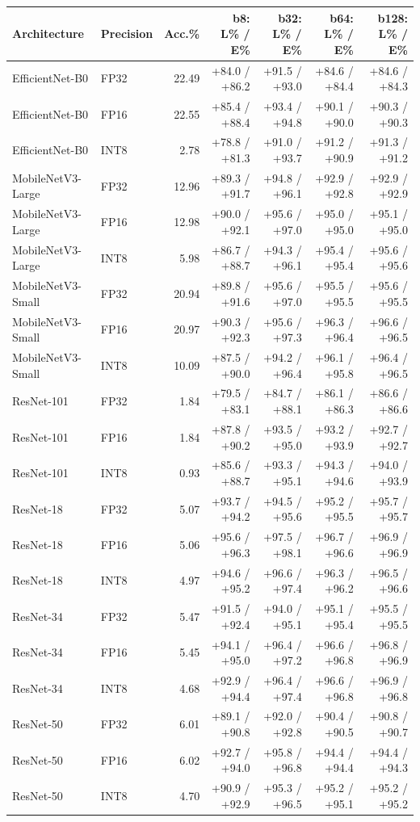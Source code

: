 \begin{tabular}{@{}llrrrrr@{}}
\toprule
Architecture & Precision & Acc.\% & b8: L\% / E\% & b32: L\% / E\% & b64: L\% / E\% & b128: L\% / E\%\\\midrule
EfficientNet-B0 & FP32 & 22.49 & +84.0 / +86.2 & +91.5 / +93.0 & +84.6 / +84.4 & +84.6 / +84.3\\
EfficientNet-B0 & FP16 & 22.55 & +85.4 / +88.4 & +93.4 / +94.8 & +90.1 / +90.0 & +90.3 / +90.3\\
EfficientNet-B0 & INT8 & 2.78 & +78.8 / +81.3 & +91.0 / +93.7 & +91.2 / +90.9 & +91.3 / +91.2\\
MobileNetV3-Large & FP32 & 12.96 & +89.3 / +91.7 & +94.8 / +96.1 & +92.9 / +92.8 & +92.9 / +92.9\\
MobileNetV3-Large & FP16 & 12.98 & +90.0 / +92.1 & +95.6 / +97.0 & +95.0 / +95.0 & +95.1 / +95.0\\
MobileNetV3-Large & INT8 & 5.98 & +86.7 / +88.7 & +94.3 / +96.1 & +95.4 / +95.4 & +95.6 / +95.6\\
MobileNetV3-Small & FP32 & 20.94 & +89.8 / +91.6 & +95.6 / +97.0 & +95.5 / +95.5 & +95.6 / +95.5\\
MobileNetV3-Small & FP16 & 20.97 & +90.3 / +92.3 & +95.6 / +97.3 & +96.3 / +96.4 & +96.6 / +96.5\\
MobileNetV3-Small & INT8 & 10.09 & +87.5 / +90.0 & +94.2 / +96.4 & +96.1 / +95.8 & +96.4 / +96.5\\
ResNet-101 & FP32 & 1.84 & +79.5 / +83.1 & +84.7 / +88.1 & +86.1 / +86.3 & +86.6 / +86.6\\
ResNet-101 & FP16 & 1.84 & +87.8 / +90.2 & +93.5 / +95.0 & +93.2 / +93.9 & +92.7 / +92.7\\
ResNet-101 & INT8 & 0.93 & +85.6 / +88.7 & +93.3 / +95.1 & +94.3 / +94.6 & +94.0 / +93.9\\
ResNet-18 & FP32 & 5.07 & +93.7 / +94.2 & +94.5 / +95.6 & +95.2 / +95.5 & +95.7 / +95.7\\
ResNet-18 & FP16 & 5.06 & +95.6 / +96.3 & +97.5 / +98.1 & +96.7 / +96.6 & +96.9 / +96.9\\
ResNet-18 & INT8 & 4.97 & +94.6 / +95.2 & +96.6 / +97.4 & +96.3 / +96.2 & +96.5 / +96.6\\
ResNet-34 & FP32 & 5.47 & +91.5 / +92.4 & +94.0 / +95.1 & +95.1 / +95.4 & +95.5 / +95.5\\
ResNet-34 & FP16 & 5.45 & +94.1 / +95.0 & +96.4 / +97.2 & +96.6 / +96.8 & +96.8 / +96.9\\
ResNet-34 & INT8 & 4.68 & +92.9 / +94.4 & +96.4 / +97.4 & +96.6 / +96.8 & +96.9 / +96.8\\
ResNet-50 & FP32 & 6.01 & +89.1 / +90.8 & +92.0 / +92.8 & +90.4 / +90.5 & +90.8 / +90.7\\
ResNet-50 & FP16 & 6.02 & +92.7 / +94.0 & +95.8 / +96.8 & +94.4 / +94.4 & +94.4 / +94.3\\
ResNet-50 & INT8 & 4.70 & +90.9 / +92.9 & +95.3 / +96.5 & +95.2 / +95.1 & +95.2 / +95.2\\
\bottomrule
\end{tabular}
